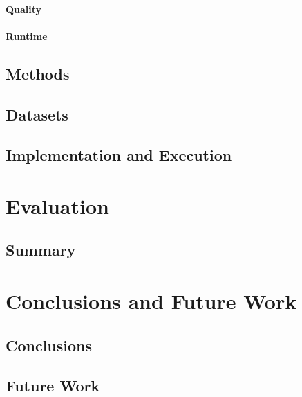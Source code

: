 \documentclass{article}
\theoremstyle{definition}
\begin{document}
\paragraph{Quality}

\paragraph{Runtime}

\subsection{Methods}
\label{sec:osd:experimental-design:methods}

\subsection{Datasets}
\label{sec:osd:experimental-design:datasets}

\subsection{Implementation and Execution}
\label{sec:osd:experimental-design:implementation}

\cite{bestuzheva2021scip}
\cite{deMoura2008z3}
\cite{perron2022or-tools}

\section{Evaluation}
\label{sec:osd:evaluation}

\subsection{Summary}
\label{sec:osd:evaluation:summary}

\section{Conclusions and Future Work}
\label{sec:osd:conclusion}

\subsection{Conclusions}
\label{sec:osd:conclusion:conclusion}

\subsection{Future Work}
\label{sec:osd:conclusion:future-work}
\end{document}
